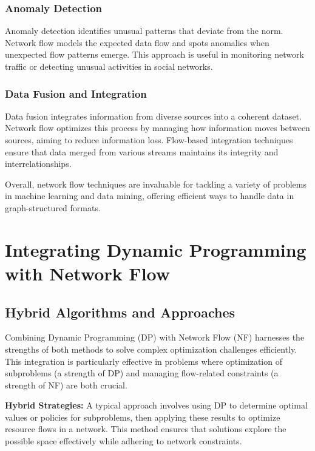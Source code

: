 \documentclass[12pt]{book} %
\begin{document}
\subsubsection{Anomaly Detection}

Anomaly detection identifies unusual patterns that deviate from the norm. Network flow models the expected data flow and spots anomalies when unexpected flow patterns emerge. This approach is useful in monitoring network traffic or detecting unusual activities in social networks.

\subsubsection{Data Fusion and Integration}

Data fusion integrates information from diverse sources into a coherent dataset. Network flow optimizes this process by managing how information moves between sources, aiming to reduce information loss. Flow-based integration techniques ensure that data merged from various streams maintains its integrity and interrelationships.

Overall, network flow techniques are invaluable for tackling a variety of problems in machine learning and data mining, offering efficient ways to handle data in graph-structured formats.


\section{Integrating Dynamic Programming with Network Flow}

\subsection{Hybrid Algorithms and Approaches}

Combining Dynamic Programming (DP) with Network Flow (NF) harnesses the strengths of both methods to solve complex optimization challenges efficiently. This integration is particularly effective in problems where optimization of subproblems (a strength of DP) and managing flow-related constraints (a strength of NF) are both crucial.

\textbf{Hybrid Strategies:}
A typical approach involves using DP to determine optimal values or policies for subproblems, then applying these results to optimize resource flows in a network. This method ensures that solutions explore the possible space effectively while adhering to network constraints.
\end{document}
